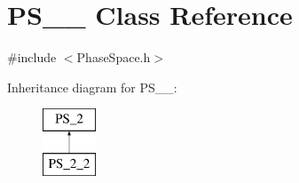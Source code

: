 \hypertarget{classPS__2__2}{\section{P\-S\-\_\-\_ Class Reference}
\label{classPS__2__2}
}


{\ttfamily \#include $<$Phase\-Space.\-h$>$}

Inheritance diagram for P\-S\-\_\-\_\-:\begin{figure}[H]
\begin{center}
\leavevmode
\includegraphics[height=2.000000cm]{classPS__2__2}
\end{center}
\end{figure}
